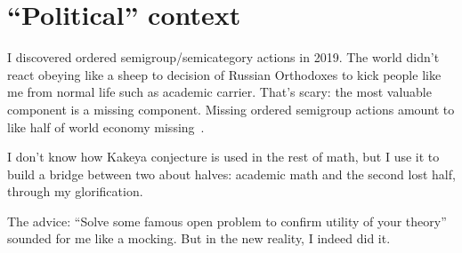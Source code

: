 \documentclass[oneside,draft]{amsart}
\begin{document}
\section{``Political'' context}

I discovered ordered semigroup/semicategory actions in 2019. The world didn't react obeying like a sheep to decision of Russian Orthodoxes to kick people like me from normal life such as academic carrier. That's scary: the most valuable component is a missing component. Missing ordered semigroup actions amount to like half of world economy missing~\cite{osa-important}.

I don't know how Kakeya conjecture is used in the rest of math, but I use it to build a bridge between two about halves: academic math and the second lost half, through my glorification.

The advice: ``Solve some famous open problem to confirm utility of your theory'' sounded for me like a mocking. But in the new reality, I indeed did it.



\end{document}
